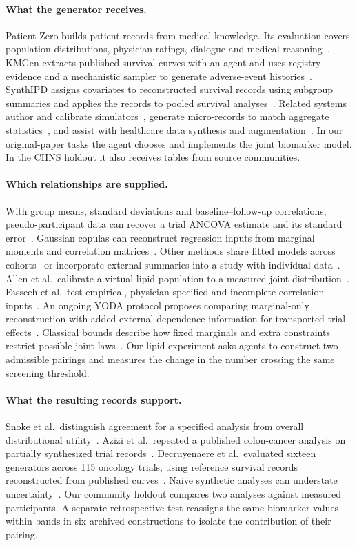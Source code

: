 \documentclass[sigconf,anonymous,review]{acmart}
\begin{document}
\paragraph{What the generator receives.}
Patient-Zero builds patient records from medical knowledge. Its evaluation covers population distributions, physician ratings, dialogue and medical reasoning~\cite{patientzero}. KMGen extracts published survival curves with an agent and uses registry evidence and a mechanistic sampler to generate adverse-event histories~\cite{kmgen}. SynthIPD assigns covariates to reconstructed survival records using subgroup summaries and applies the records to pooled survival analyses~\cite{synthipd}. Related systems author and calibrate simulators~\cite{gsim}, generate micro-records to match aggregate statistics~\cite{llmsynthor}, and assist with healthcare data synthesis and augmentation~\cite{synthcraft}. In our original-paper tasks the agent chooses and implements the joint biomarker model. In the CHNS holdout it also receives tables from source communities.

\paragraph{Which relationships are supplied.}
With group means, standard deviations and baseline--follow-up correlations, pseudo-participant data can recover a trial ANCOVA estimate and its standard error~\cite{pseudoancova}. Gaussian copulas can reconstruct regression inputs from marginal moments and correlation matrices~\cite{bonofiglio}. Other methods share fitted models across cohorts~\cite{filshtein} or incorporate external summaries into a study with individual data~\cite{syndi}. Allen et al.\ calibrate a virtual lipid population to a measured joint distribution~\cite{allenlipid}. Fasseeh et al.\ test empirical, physician-specified and incomplete correlation inputs~\cite{fasseeh}. An ongoing YODA protocol proposes comparing marginal-only reconstruction with added external dependence information for transported trial effects~\cite{yodaprotocol}. Classical bounds describe how fixed marginals and extra constraints restrict possible joint laws~\cite{bounds,makarov,zaev}. Our lipid experiment asks agents to construct two admissible pairings and measures the change in the number crossing the same screening threshold.

\paragraph{What the resulting records support.}
Snoke et al.\ distinguish agreement for a specified analysis from overall distributional utility~\cite{specificutility}. Azizi et al.\ repeated a published colon-cancer analysis on partially synthesized trial records~\cite{azizi}. Decruyenaere et al.\ evaluated sixteen generators across 115 oncology trials, using reference survival records reconstructed from published curves~\cite{oncology115}. Naive synthetic analyses can understate uncertainty~\cite{inferential,oncology115}. Our community holdout compares two analyses against measured participants. A separate retrospective test reassigns the same biomarker values within bands in six archived constructions to isolate the contribution of their pairing.
\end{document}
